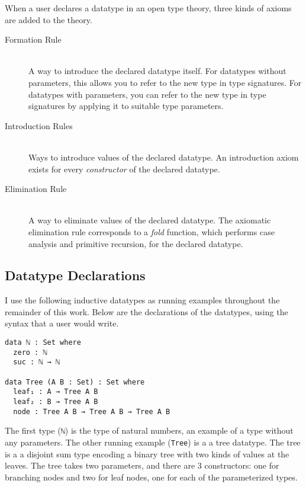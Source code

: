 \documentclass[runningheads,a4paper]{llncs}
\begin{document}
When a user declares a datatype in an open type theory, three kinds of
axioms are added to the theory.

\begin{description}
\item[Formation Rule]\hfill \\
A way to introduce the declared datatype itself. For datatypes without
parameters, this allows you to refer to the new type in type
signatures. For datatypes with parameters, you can refer to the new
type in type signatures by applying it to suitable type parameters.
\\
\item[Introduction Rules]\hfill \\
Ways to introduce values of the declared datatype. An introduction axiom
exists for every {\it constructor} of the declared datatype.
\\
\item[Elimination Rule]\hfill \\
A way to eliminate values of the declared datatype. The axiomatic
elimination rule corresponds to a {\it fold} function,
which performs case analysis and primitive recursion, for the declared
datatype.
\end{description}

\subsection{Datatype Declarations}

I use the following inductive datatypes as running examples throughout the
remainder of this work. Below are the declarations of the datatypes,
using the syntax that a user would write. 

\begin{verbatim}
data ℕ : Set where
  zero : ℕ
  suc : ℕ → ℕ

data Tree (A B : Set) : Set where
  leaf₁ : A → Tree A B
  leaf₂ : B → Tree A B
  node : Tree A B → Tree A B → Tree A B
\end{verbatim}

The first type ({\tt ℕ}) is the type of natural numbers, an example of a type
without any parameters. The other running example ({\tt Tree}) is a
a tree datatype. The tree is a
a disjoint sum type encoding a binary tree with two kinds of values at the leaves. The
tree takes two parameters, and there are 3 constructors: one for branching nodes and two for
leaf nodes, one for each of the
parameterized types.
\end{document}
